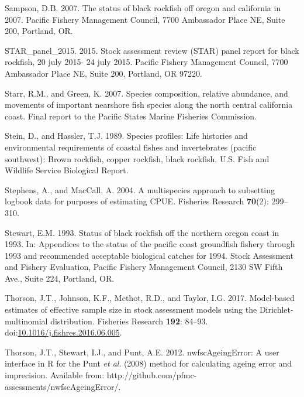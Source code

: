 \documentclass[11pt,
  english,
  letterpaper,
]{article}
\newlength{\cslhangindent}
\newenvironment{CSLReferences}[2] %
 {%
  \setlength{\parindent}{0pt}
  \ifodd #1 \everypar{\setlength{\hangindent}{\cslhangindent}}\ignorespaces\fi
  \ifnum #2 > 0
  \setlength{\parskip}{#2\baselineskip}
  \fi
 }%
 {}
\begin{document}
\begin{CSLReferences}{1}{0}
\leavevmode{}%
Sampson, D.B. 2007. The status of black rockfish off oregon and california in 2007. Pacific Fishery Management Council, 7700 Ambassador Place NE, Suite 200, Portland, OR.

\leavevmode{}%
STAR\_panel\_2015. 2015. Stock assessment review (STAR) panel report for black rockfish, 20 july 2015- 24 july 2015. Pacific Fishery Management Council, 7700 Ambassador Place NE, Suite 200, Portland, OR 97220.

\leavevmode{}%
Starr, R.M., and Green, K. 2007. Species composition, relative abundance, and movements of important nearshore fish species along the north central california coast. Final report to the Pacific States Marine Fisheries Commission.

\leavevmode{}%
Stein, D., and Hassler, T.J. 1989. Species profiles: Life histories and environmental requirements of coastal fishes and invertebrates (pacific southwest): Brown rockfish, copper rockfish, black rockfish. U.S. Fish and Wildlife Service Biological Report.

\leavevmode{}%
Stephens, A., and MacCall, A. 2004. A multispecies approach to subsetting logbook data for purposes of estimating {CPUE}. Fisheries Research \textbf{70}(2): 299--310.

\leavevmode{}%
Stewart, E.M. 1993. Status of black rockfish off the northern oregon coast in 1993. In: Appendices to the status of the pacific coast groundfish fishery through 1993 and recommended acceptable biological catches for 1994. Stock Assessment and Fishery Evaluation, Pacific Fishery Management Council, 2130 SW Fifth Ave., Suite 224, Portland, OR.

\leavevmode{}%
Thorson, J.T., Johnson, K.F., Methot, R.D., and Taylor, I.G. 2017. Model-based estimates of effective sample size in stock assessment models using the {Dirichlet}-multinomial distribution. Fisheries Research \textbf{192}: 84--93. doi:\href{https://doi.org/10.1016/j.fishres.2016.06.005}{10.1016/j.fishres.2016.06.005}.

\leavevmode{}%
Thorson, J.T., Stewart, I.J., and Punt, A.E. 2012. {nwfscAgeingError}: A user interface in {R} for the {P}unt \emph{et al}. (2008) method for calculating ageing error and imprecision. Available from: http://github.com/pfmc-assessments/nwfscAgeingError/.


\end{CSLReferences}
\end{document}
